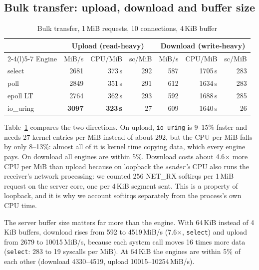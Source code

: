 \documentclass[conference,10pt]{IEEEtran}
\newcommand{\us}{\,\textmu s}
\newcommand{\code}[1]{\texttt{#1}}
\begin{document}
\subsection{Bulk transfer: upload, download and buffer size}
\begin{table}[t]
\caption{Bulk transfer, 1\,MiB requests, 10 connections, 4\,KiB buffer}
\label{tab:bulk}
\centering\small
\begin{tabular}{@{}lrrrrrr@{}}
\toprule
 & \multicolumn{3}{c}{Upload (read-heavy)} & \multicolumn{3}{c}{Download (write-heavy)}\\
\cmidrule(lr){2-4}\cmidrule(l){5-7}
Engine & MiB/s & CPU/MiB & sc/MiB & MiB/s & CPU/MiB & sc/MiB\\
\midrule
select    & 2681 & 373\us & 292 & 587 & 1705\us & 283\\
poll      & 2849 & 351\us & 291 & 612 & 1634\us & 283\\
epoll LT  & 2764 & 362\us & 293 & 592 & 1688\us & 285\\
io\_uring & \textbf{3097} & \textbf{323\us} & 27 & 609 & 1640\us & 26\\
\bottomrule
\end{tabular}
\end{table}

Table~\ref{tab:bulk} compares the two directions. On upload, \code{io\_uring} is 9--15\% faster and needs 27 kernel entries per MiB instead of about 292, but the CPU per MiB falls by only 8--13\%: almost all of it is kernel time copying data, which every engine pays. On download all engines are within 5\%. Download costs about 4.6$\times$ more CPU per MiB than upload because on loopback the \emph{sender's} CPU also runs the receiver's network processing: we counted 256 NET\_RX softirqs per 1\,MiB request on the server core, one per 4\,KiB segment sent. This is a property of loopback, and it is why we account softirqs separately from the process's own CPU time.

The server buffer size matters far more than the engine. With 64\,KiB instead of 4\,KiB buffers, download rises from 592 to 4519\,MiB/s (7.6$\times$, \code{select}) and upload from 2679 to 10015\,MiB/s, because each system call moves 16 times more data (\code{select}: 283 to 19 syscalls per MiB). At 64\,KiB the engines are within 5\% of each other (download 4330--4519, upload 10015--10254\,MiB/s).
\end{document}
